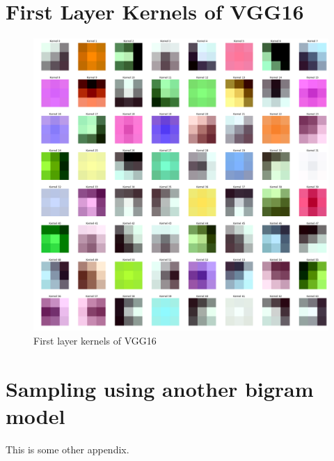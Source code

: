 \chapter{First Layer Kernels of VGG16}
\makeatletter{}\makeatother
\label{appen:conv1_1}

\begin{figure}[h]
    \centering
    \includegraphics[width=\linewidth]{appendices/fig/conv1_1.png}
    \caption{First layer kernels of VGG16}
    \label{fig:my_label}
\end{figure}

\chapter{Sampling using another bigram model}
\makeatletter{}\makeatother
\label{appen:derivations_bigramseg}

This is some other appendix.